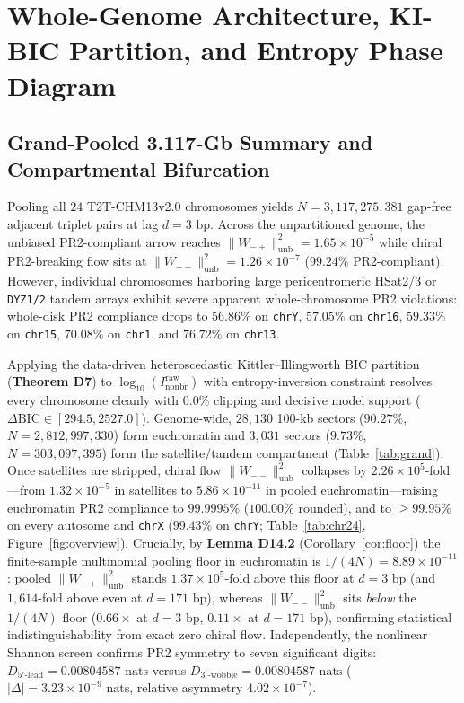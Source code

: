 \documentclass[11pt,a4paper]{article}
\newcommand{\Wmp}{W_{-+}}
\newcommand{\Wmm}{W_{--}}
\newcommand{\Inbraw}{I_{\mathrm{nonbr}}^{\mathrm{raw}}}
\newcommand{\dBIC}{\Delta\mathrm{BIC}}
\begin{document}
\section{Whole-Genome Architecture, KI-BIC Partition, and Entropy Phase Diagram}
\label{sec:results_a}

\subsection{Grand-Pooled 3.117-Gb Summary and Compartmental Bifurcation}
Pooling all $24$ T2T-CHM13v2.0 chromosomes yields $N = 3{,}117{,}275{,}381$ gap-free adjacent triplet pairs at lag $d=3\text{ bp}$. Across the unpartitioned genome, the unbiased PR2-compliant arrow reaches $\|\Wmp\|^2_{\mathrm{unb}} = 1.65\times 10^{-5}$ while chiral PR2-breaking flow sits at $\|\Wmm\|^2_{\mathrm{unb}} = 1.26\times 10^{-7}$ ($99.24\%$ PR2-compliant). However, individual chromosomes harboring large pericentromeric HSat2/3 or \texttt{DYZ1/2} tandem arrays exhibit severe apparent whole-chromosome PR2 violations: whole-disk PR2 compliance drops to $56.86\%$ on \texttt{chrY}, $57.05\%$ on \texttt{chr16}, $59.33\%$ on \texttt{chr15}, $70.08\%$ on \texttt{chr1}, and $76.72\%$ on \texttt{chr13}.

Applying the data-driven heteroscedastic Kittler--Illingworth BIC partition (\textbf{Theorem D7}) to $\log_{10}(\Inbraw)$ with entropy-inversion constraint resolves every chromosome cleanly with $0.0\%$ clipping and decisive model support ($\dBIC \in [294.5, 2527.0]$). Genome-wide, $28{,}130$ 100-kb sectors ($90.27\%$, $N = 2{,}812{,}997{,}330$) form euchromatin and $3{,}031$ sectors ($9.73\%$, $N = 303{,}097{,}395$) form the satellite/tandem compartment (Table~\ref{tab:grand}). Once satellites are stripped, chiral flow $\|\Wmm\|^2_{\mathrm{unb}}$ collapses by $2.26\times 10^5$-fold---from $1.32\times 10^{-5}$ in satellites to $5.86\times 10^{-11}$ in pooled euchromatin---raising euchromatin PR2 compliance to $99.9995\%$ ($100.00\%$ rounded), and to $\ge 99.95\%$ on every autosome and \texttt{chrX} ($99.43\%$ on \texttt{chrY}; Table~\ref{tab:chr24}, Figure~\ref{fig:overview}). Crucially, by \textbf{Lemma D14.2} (Corollary~\ref{cor:floor}) the finite-sample multinomial pooling floor in euchromatin is $1/(4N) = 8.89\times 10^{-11}$: pooled $\|\Wmp\|^2_{\mathrm{unb}}$ stands $1.37\times 10^5$-fold above this floor at $d=3\text{ bp}$ (and $1{,}614$-fold above even at $d=171\text{ bp}$), whereas $\|\Wmm\|^2_{\mathrm{unb}}$ sits \emph{below} the $1/(4N)$ floor ($0.66\times$ at $d=3\text{ bp}$, $0.11\times$ at $d=171\text{ bp}$), confirming statistical indistinguishability from exact zero chiral flow. Independently, the nonlinear Shannon screen confirms PR2 symmetry to seven significant digits: $D_{5'\text{-lead}} = 0.00804587\text{ nats}$ versus $D_{3'\text{-wobble}} = 0.00804587\text{ nats}$ ($|\Delta| = 3.23\times 10^{-9}\text{ nats}$, relative asymmetry $4.02\times 10^{-7}$).
\end{document}
